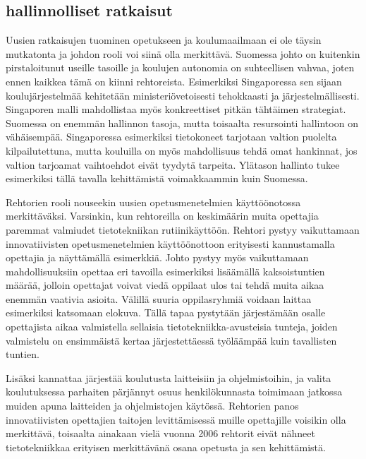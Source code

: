 \documentclass[utf8,bachelor]{gradu3}
\begin{document}
\subsection{hallinnolliset ratkaisut}
Uusien ratkaisujen tuominen opetukseen ja koulumaailmaan ei ole täysin mutkatonta ja johdon rooli voi siinä olla merkittävä. Suomessa johto on kuitenkin pirstaloitunut useille tasoille ja koulujen autonomia on suhteellisen vahvaa, joten ennen kaikkea tämä on kiinni rehtoreista. Esimerkiksi Singaporessa sen sijaan koulujärjestelmää kehitetään ministeriövetoisesti tehokkaasti ja järjestelmällisesti. Singaporen malli mahdollistaa myös konkreettiset pitkän tähtäimen strategiat. Suomessa on enemmän hallinnon tasoja, mutta toisaalta resursointi hallintoon on vähäisempää. Singaporessa esimerkiksi tietokoneet tarjotaan valtion puolelta kilpailutettuna, mutta kouluilla on myös mahdollisuus tehdä omat hankinnat, jos valtion tarjoamat vaihtoehdot eivät tyydytä tarpeita. Ylätason hallinto tukee esimerkiksi tällä tavalla kehittämistä voimakkaammin kuin Suomessa. \parencite[][]{koulunArki}

Rehtorien rooli nouseekin uusien opetusmenetelmien käyttöönotossa merkittäväksi. Varsinkin, kun rehtoreilla on keskimäärin muita opettajia paremmat valmiudet tietotekniikan rutiinikäyttöön. \parencite[][]{itviikkoWilen} Rehtori pystyy vaikuttamaan innovatiivisten opetusmenetelmien käyttöönottoon erityisesti kannustamalla opettajia ja näyttämällä esimerkkiä. Johto pystyy myös vaikuttamaan mahdollisuuksiin opettaa eri tavoilla esimerkiksi lisäämällä kaksoistuntien määrää, jolloin opettajat voivat viedä oppilaat ulos tai tehdä muita aikaa enemmän vaativia asioita. Välillä suuria oppilasryhmiä voidaan laittaa esimerkiksi katsomaan elokuva. Tällä tapaa pystytään järjestämään osalle opettajista aikaa valmistella sellaisia tietotekniikka-avusteisia tunteja, joiden valmistelu on ensimmäistä kertaa järjestettäessä työläämpää kuin tavallisten tuntien.

Lisäksi kannattaa järjestää koulutusta laitteisiin ja ohjelmistoihin, ja valita koulutuksessa parhaiten pärjännyt osuus henkilökunnasta toimimaan jatkossa muiden apuna laitteiden ja ohjelmistojen käytössä. Rehtorien panos innovatiivisten opettajien taitojen levittämisessä muille opettajille voisikin olla merkittävä, toisaalta ainakaan vielä vuonna 2006 rehtorit eivät nähneet tietotekniikkaa erityisen merkittävänä osana opetusta ja sen kehittämistä. \parencite[][]{koulunArki}
\end{document}

